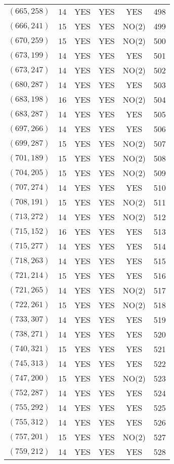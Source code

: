 \begin{longtable}{|c|c|c|c|c|c|}
$(665, 258)$ & 14 & YES & YES & YES & 498\\
$(666, 241)$ & 15 & YES & YES & NO(2) & 499\\
$(670, 259)$ & 15 & YES & YES & NO(2) & 500\\
$(673, 199)$ & 14 & YES & YES & YES & 501\\
$(673, 247)$ & 14 & YES & YES & NO(2) & 502\\
$(680, 287)$ & 14 & YES & YES & YES & 503\\
$(683, 198)$ & 16 & YES & YES & NO(2) & 504\\
$(683, 287)$ & 14 & YES & YES & YES & 505\\
$(697, 266)$ & 14 & YES & YES & YES & 506\\
$(699, 287)$ & 15 & YES & YES & NO(2) & 507\\
$(701, 189)$ & 15 & YES & YES & NO(2) & 508\\
$(704, 205)$ & 15 & YES & YES & NO(2) & 509\\
$(707, 274)$ & 14 & YES & YES & YES & 510\\
$(708, 191)$ & 15 & YES & YES & NO(2) & 511\\
$(713, 272)$ & 14 & YES & YES & NO(2) & 512\\
$(715, 152)$ & 16 & YES & YES & YES & 513\\
$(715, 277)$ & 14 & YES & YES & YES & 514\\
$(718, 263)$ & 14 & YES & YES & YES & 515\\
$(721, 214)$ & 15 & YES & YES & YES & 516\\
$(721, 265)$ & 14 & YES & YES & NO(2) & 517\\
$(722, 261)$ & 15 & YES & YES & NO(2) & 518\\
$(733, 307)$ & 14 & YES & YES & YES & 519\\
$(738, 271)$ & 14 & YES & YES & YES & 520\\
$(740, 321)$ & 15 & YES & YES & YES & 521\\
$(745, 313)$ & 14 & YES & YES & YES & 522\\
$(747, 200)$ & 15 & YES & YES & NO(2) & 523\\
$(752, 287)$ & 14 & YES & YES & YES & 524\\
$(755, 292)$ & 14 & YES & YES & YES & 525\\
$(755, 312)$ & 14 & YES & YES & YES & 526\\
$(757, 201)$ & 15 & YES & YES & NO(2) & 527\\
$(759, 212)$ & 14 & YES & YES & YES & 528\\

\end{longtable}
